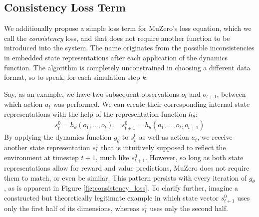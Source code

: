 \subsection{Consistency Loss Term}
We additionally propose a simple loss term for MuZero's loss equation, which we call the \textit{consistency} loss, and that does not require another function to be introduced into the system. The name originates from the possible inconsistencies in embedded state representations after each application of the dynamics function. The algorithm is completely unconstrained in choosing a different data format, so to speak, for each simulation step $k$.

Say, as an example, we have two subsequent observations $o_t$ and $o_{t+1}$, between which action $a_t$ was performed. We can create their corresponding internal state representations with the help of the representation function $h_\theta$:
\begin{equation*}
    \begin{array}{cc}
        s^0_t = h_\theta(o_1, ..., o_t), &
        s^0_{t+1} = h_\theta(o_1, ..., o_t, o_{t+1})
    \end{array}
\end{equation*}
By applying the dynamics function $g_\theta$ to $s_t^0$ as well as action $a_t$, we receive another state representation $s_t^1$ that is intuitively supposed to reflect the environment at timestep $t+1$, much like $s_{t+1}^0$. However, so long as both state representations allow for reward and value predictions, MuZero does not require them to match, or even be similar. This pattern persists with every iteration of $g_\theta$, as is apparent in Figure \ref{fig:consistency_loss}. To clarify further, imagine a constructed but theoretically legitimate example in which state vector $s^0_{t+1}$ uses only the first half of its dimensions, whereas $s^1_t$ uses only the second half.
